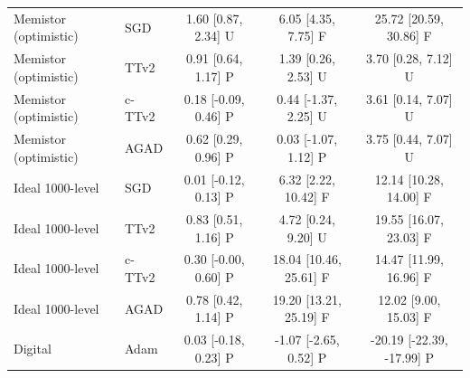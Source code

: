 \begin{table}[t]
\begin{tabular}{llccc}
Memistor (optimistic) & SGD & 1.60 [0.87, 2.34] U & 6.05 [4.35, 7.75] F & 25.72 [20.59, 30.86] F\\
Memistor (optimistic) & TTv2 & 0.91 [0.64, 1.17] P & 1.39 [0.26, 2.53] U & 3.70 [0.28, 7.12] U\\
Memistor (optimistic) & c-TTv2 & 0.18 [-0.09, 0.46] P & 0.44 [-1.37, 2.25] U & 3.61 [0.14, 7.07] U\\
Memistor (optimistic) & AGAD & 0.62 [0.29, 0.96] P & 0.03 [-1.07, 1.12] P & 3.75 [0.44, 7.07] U\\
Ideal 1000-level & SGD & 0.01 [-0.12, 0.13] P & 6.32 [2.22, 10.42] F & 12.14 [10.28, 14.00] F\\
Ideal 1000-level & TTv2 & 0.83 [0.51, 1.16] P & 4.72 [0.24, 9.20] U & 19.55 [16.07, 23.03] F\\
Ideal 1000-level & c-TTv2 & 0.30 [-0.00, 0.60] P & 18.04 [10.46, 25.61] F & 14.47 [11.99, 16.96] F\\
Ideal 1000-level & AGAD & 0.78 [0.42, 1.14] P & 19.20 [13.21, 25.19] F & 12.02 [9.00, 15.03] F\\
Digital & Adam & 0.03 [-0.18, 0.23] P & -1.07 [-2.65, 0.52] P & -20.19 [-22.39, -17.99] P\\
\bottomrule\end{tabular}\end{table}

